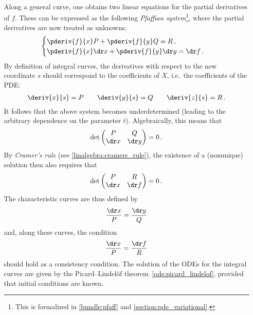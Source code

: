 {        Along a general curve, one obtains two linear equations for the partial derivatives of $f$. These can be expressed as the following \textit{Pfaffian system}\footnote{This is formalized in \cref{bundle:pfaff} and \cref{section:pde_variational}.}, where the partial derivatives are now treated as unknowns:
        \begin{gather}
            \begin{cases}
                \displaystyle \pderiv{f}{x}P+\pderiv{f}{y}Q = R\,,\\
                \displaystyle \pderiv{f}{x}\dr x+\pderiv{f}{y}\dr y = \dr f\,.
            \end{cases}
        \end{gather}
        By definition of integral curves, the derivatives with respect to the new coordinate $s$ should correspond to the coefficients of $X$, i.e.~the coefficients of the PDE:
        \begin{gather}
            \deriv{x}{s} = P\qquad\deriv{y}{s} = Q\qquad\deriv{z}{s} = R\,.
        \end{gather}
        It follows that the above system becomes underdetermined (leading to the arbitrary dependence on the parameter $t$). Algebraically, this means that
        \begin{gather}
            \det
            \begin{pmatrix}
                P&Q\\
                \dr x&\dr y
            \end{pmatrix}
            =0\,.
        \end{gather}
        By \textit{Cramer's rule} (see \cref{linalgebra:cramers_rule}), the existence of a (nonunique) solution then also requires that
        \begin{gather}
            \det
            \begin{pmatrix}
                P&R\\
                \dr x&\dr f
            \end{pmatrix}
            =0\,.
        \end{gather}
        The characteristic curves are thus defined by
        \begin{gather}
            \frac{\dr x}{P} = \frac{\dr y}{Q}
        \end{gather}
        and, along these curves, the condition
        \begin{gather}
            \frac{\dr x}{P} = \frac{\dr f}{R}
        \end{gather}
        should hold as a consistency condition. The solution of the ODEs for the integral curves are given by the Picard--Lindel\"of theorem~\ref{ode:picard_lindelof}, provided that initial conditions are known.
    }

